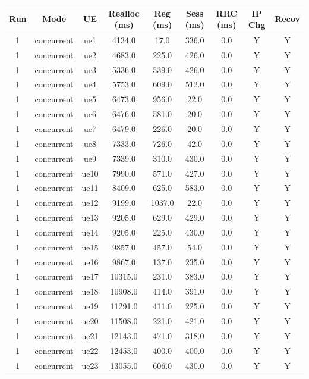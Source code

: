 \begin{table}[ht]
\centering
\begin{tabular}{|c|c|c|c|c|c|c|c|c|}
\hline
Run & Mode & UE & Realloc (ms) & Reg (ms) & Sess (ms) & RRC (ms) & IP Chg & Recov \\
\hline
1 & concurrent & ue1 & 4134.0 & 17.0 & 336.0 & 0.0 & Y & Y \\
1 & concurrent & ue2 & 4683.0 & 225.0 & 426.0 & 0.0 & Y & Y \\
1 & concurrent & ue3 & 5336.0 & 539.0 & 426.0 & 0.0 & Y & Y \\
1 & concurrent & ue4 & 5753.0 & 609.0 & 512.0 & 0.0 & Y & Y \\
1 & concurrent & ue5 & 6473.0 & 956.0 & 22.0 & 0.0 & Y & Y \\
1 & concurrent & ue6 & 6476.0 & 581.0 & 20.0 & 0.0 & Y & Y \\
1 & concurrent & ue7 & 6479.0 & 226.0 & 20.0 & 0.0 & Y & Y \\
1 & concurrent & ue8 & 7333.0 & 726.0 & 42.0 & 0.0 & Y & Y \\
1 & concurrent & ue9 & 7339.0 & 310.0 & 430.0 & 0.0 & Y & Y \\
1 & concurrent & ue10 & 7990.0 & 571.0 & 427.0 & 0.0 & Y & Y \\
1 & concurrent & ue11 & 8409.0 & 625.0 & 583.0 & 0.0 & Y & Y \\
1 & concurrent & ue12 & 9199.0 & 1037.0 & 22.0 & 0.0 & Y & Y \\
1 & concurrent & ue13 & 9205.0 & 629.0 & 429.0 & 0.0 & Y & Y \\
1 & concurrent & ue14 & 9205.0 & 225.0 & 430.0 & 0.0 & Y & Y \\
1 & concurrent & ue15 & 9857.0 & 457.0 & 54.0 & 0.0 & Y & Y \\
1 & concurrent & ue16 & 9867.0 & 137.0 & 235.0 & 0.0 & Y & Y \\
1 & concurrent & ue17 & 10315.0 & 231.0 & 383.0 & 0.0 & Y & Y \\
1 & concurrent & ue18 & 10908.0 & 414.0 & 391.0 & 0.0 & Y & Y \\
1 & concurrent & ue19 & 11291.0 & 411.0 & 225.0 & 0.0 & Y & Y \\
1 & concurrent & ue20 & 11508.0 & 221.0 & 421.0 & 0.0 & Y & Y \\
1 & concurrent & ue21 & 12143.0 & 471.0 & 318.0 & 0.0 & Y & Y \\
1 & concurrent & ue22 & 12453.0 & 400.0 & 400.0 & 0.0 & Y & Y \\
1 & concurrent & ue23 & 13055.0 & 606.0 & 430.0 & 0.0 & Y & Y \\

\end{tabular}
\end{table}
